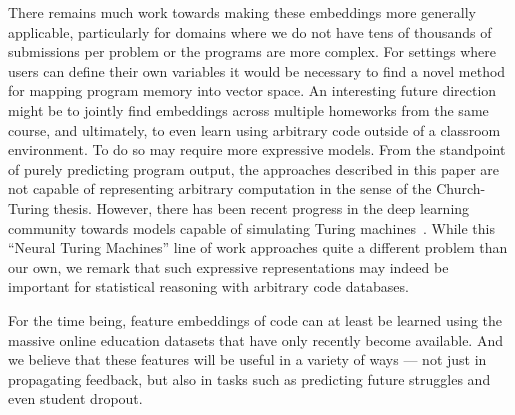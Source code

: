 There remains much work towards making these embeddings more 
generally applicable, particularly for domains where we do not have
tens of thousands of submissions per problem or the programs are more complex. For settings where users can define their own variables it would be necessary to find a novel method for mapping program memory into vector space. An interesting
future direction might be to jointly find embeddings across multiple homeworks from the same course, and ultimately, to 
even learn  using arbitrary code outside of a classroom environment. To do so may require more expressive models. From the standpoint  of purely predicting  program output, the approaches described in this paper are not capable of representing arbitrary computation in the 
sense of the Church-Turing thesis.  However,
there has been recent progress in the deep learning community
towards models capable of simulating Turing machines~\cite{graves2014neural}. 
While this  ``Neural Turing Machines'' 
line of work approaches quite a different problem
than our own, we remark that such expressive
representations may indeed be important for statistical
reasoning with arbitrary code databases.


For the time being, 
feature embeddings of code can at least be learned using
the massive online education
datasets that have only recently
become available.  And we believe that these features will
be useful in a variety of ways --- not just in propagating 
feedback, but also in tasks such as  predicting future struggles and even student dropout.





